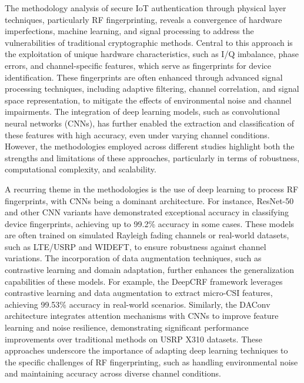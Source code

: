 \documentclass[conference]{IEEEtran}
\begin{document}
The methodology analysis of secure IoT authentication through physical layer techniques, particularly RF fingerprinting, reveals a convergence of hardware imperfections, machine learning, and signal processing to address the vulnerabilities of traditional cryptographic methods. Central to this approach is the exploitation of unique hardware characteristics, such as I/Q imbalance, phase errors, and channel-specific features, which serve as fingerprints for device identification. These fingerprints are often enhanced through advanced signal processing techniques, including adaptive filtering, channel correlation, and signal space representation, to mitigate the effects of environmental noise and channel impairments. The integration of deep learning models, such as convolutional neural networks (CNNs), has further enabled the extraction and classification of these features with high accuracy, even under varying channel conditions. However, the methodologies employed across different studies highlight both the strengths and limitations of these approaches, particularly in terms of robustness, computational complexity, and scalability.  

A recurring theme in the methodologies is the use of deep learning to process RF fingerprints, with CNNs being a dominant architecture. For instance, ResNet-50 and other CNN variants have demonstrated exceptional accuracy in classifying device fingerprints, achieving up to 99.2\% accuracy in some cases. These models are often trained on simulated Rayleigh fading channels or real-world datasets, such as LTE/USRP and WIDEFT, to ensure robustness against channel variations. The incorporation of data augmentation techniques, such as contrastive learning and domain adaptation, further enhances the generalization capabilities of these models. For example, the DeepCRF framework leverages contrastive learning and data augmentation to extract micro-CSI features, achieving 99.53\% accuracy in real-world scenarios. Similarly, the DAConv architecture integrates attention mechanisms with CNNs to improve feature learning and noise resilience, demonstrating significant performance improvements over traditional methods on USRP X310 datasets. These approaches underscore the importance of adapting deep learning techniques to the specific challenges of RF fingerprinting, such as handling environmental noise and maintaining accuracy across diverse channel conditions.  
\end{document}
